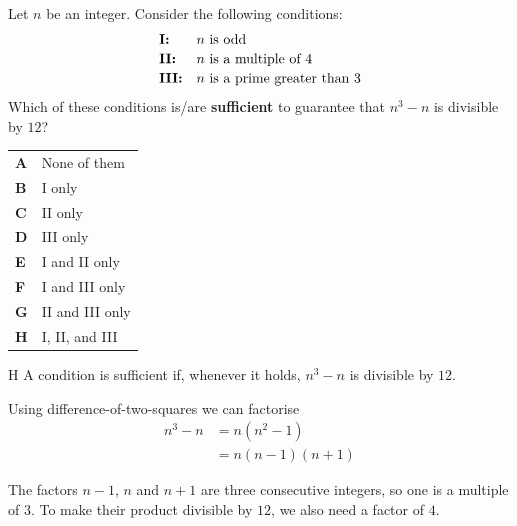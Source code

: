 \documentclass[11pt,a4paper]{article}
\begin{document}
\begin{enumerate}[label=\textbf{\arabic*.},leftmargin=*,itemsep=0pt,start=2]
\questionitem[Number]
Let $n$ be an integer. Consider the following conditions:
\[
\begin{array}{@{}l l@{}}
\textbf{I:} & \text{$n$ is odd} \\[2pt]
\textbf{II:} & \text{$n$ is a multiple of $4$} \\[2pt]
\textbf{III:} & \text{$n$ is a prime greater than $3$}
\end{array}
\]
Which of these conditions is/are \textbf{sufficient} to guarantee that $n^3-n$ is divisible by $12$?

\par\vspace*{12pt}
\begin{tabularx}{\linewidth}{@{}>{\bfseries}l Y@{}}
A &
None of them
\\[0.8em]
B &
I only
\\[0.8em]
C &
II only
\\[0.8em]
D &
III only
\\[0.8em]
E &
I and II only
\\[0.8em]
F &
I and III only
\\[0.8em]
G &
II and III only
\\[0.8em]
H &
I, II, and III
\\
\end{tabularx}

\begin{djsSolution}{H}
A condition is sufficient if, whenever it holds, $n^3-n$ is divisible by $12$.

Using difference-of-two-squares we can factorise
\begin{align*}
n^3-n&=n(n^2-1)\\[5pt]
&=n(n-1)(n+1)
\end{align*}

The factors $n-1$, $n$ and $n+1$ are three consecutive integers, so one is a multiple of $3$. To make their product divisible by $12$, we also need a factor of $4$.\\


\end{djsSolution}
\end{enumerate}
\end{document}
